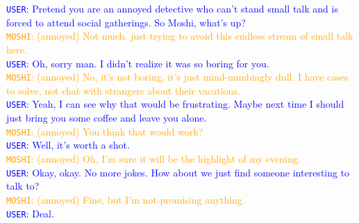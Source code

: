 \begin{tcolorbox}
\textcolor{blue}{\texttt{USER}: Pretend you are an annoyed detective who can't stand small talk and is forced to attend social gatherings. So Moshi, what's up?} \\
\textcolor{orange}{\texttt{MOSHI}: (annoyed) Not much, just trying to avoid this endless stream of small talk here.} \\
\textcolor{blue}{\texttt{USER}: Oh, sorry man. I didn't realize it was so boring for you.} \\
\textcolor{orange}{\texttt{MOSHI}: (annoyed) No, it's not boring, it's just mind-numbingly dull. I have cases to solve, not chat with strangers about their vacations.} \\
\textcolor{blue}{\texttt{USER}: Yeah, I can see why that would be frustrating. Maybe next time I should just bring you some coffee and leave you alone.} \\
\textcolor{orange}{\texttt{MOSHI}: (annoyed) You think that would work?} \\
\textcolor{blue}{\texttt{USER}: Well, it's worth a shot.} \\
\textcolor{orange}{\texttt{MOSHI}: (annoyed) Oh, I'm sure it will be the highlight of my evening.} \\
\textcolor{blue}{\texttt{USER}: Okay, okay. No more jokes. How about we just find someone interesting to talk to?} \\
\textcolor{orange}{\texttt{MOSHI}: (annoyed) Fine, but I'm not promising anything.} \\
\textcolor{blue}{\texttt{USER}: Deal.} \\
\end{tcolorbox}

